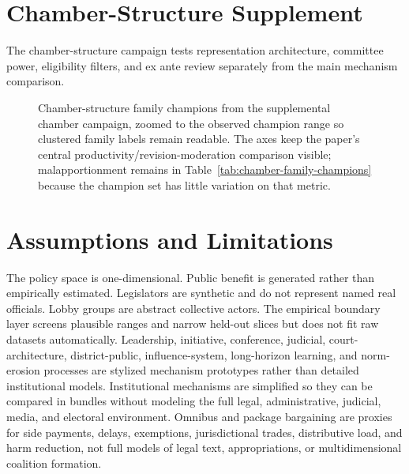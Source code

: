 \documentclass[manuscript]{acmart}
\begin{document}
\section{Chamber-Structure Supplement}

The chamber-structure campaign tests representation architecture, committee power, eligibility filters, and ex ante review separately from the main mechanism comparison.



\begin{figure}
  \centering
  
  \caption{Chamber-structure family champions from the supplemental chamber campaign, zoomed to the observed champion range so clustered family labels remain readable. The axes keep the paper's central productivity/revision-moderation comparison visible; malapportionment remains in Table~\ref{tab:chamber-family-champions} because the champion set has little variation on that metric.}
  \label{fig:chamber-productivity-compromise}
\end{figure}

\section{Assumptions and Limitations}
\label{sec:appendix-limitations}

The policy space is one-dimensional. Public benefit is generated rather than empirically estimated. Legislators are synthetic and do not represent named real officials. Lobby groups are abstract collective actors. The empirical boundary layer screens plausible ranges and narrow held-out slices but does not fit raw datasets automatically. Leadership, initiative, conference, judicial, court-architecture, district-public, influence-system, long-horizon learning, and norm-erosion processes are stylized mechanism prototypes rather than detailed institutional models. Institutional mechanisms are simplified so they can be compared in bundles without modeling the full legal, administrative, judicial, media, and electoral environment. Omnibus and package bargaining are proxies for side payments, delays, exemptions, jurisdictional trades, distributive load, and harm reduction, not full models of legal text, appropriations, or multidimensional coalition formation.
\end{document}
